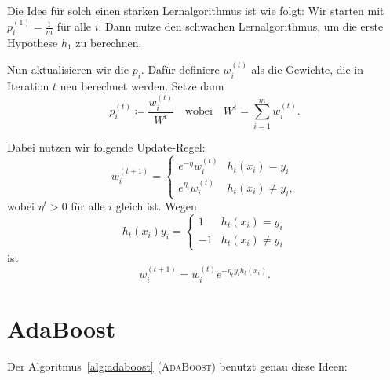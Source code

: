 \documentclass[language=ngerman,algolist,acrolist]{TemplateLecture}
\begin{document}
Die Idee für solch einen starken Lernalgorithmus ist wie folgt: Wir starten mit $p_i^{(1)} = \frac{1}{m}$ für alle $i$. Dann nutze den schwachen Lernalgorithmus, um die erste Hypothese $h_1$ zu berechnen.

Nun aktualisieren wir die $p_i$. Dafür definiere $w_i^{(t)}$ als die Gewichte, die in Iteration $t$ neu berechnet werden. Setze dann 
\begin{equation*}
    p_i^{(t)} \coloneqq \frac{w_i^{(t)}}{W^t} \quad \text{wobei} \quad W^t = \sum_{i = 1}^m w_i^{(t)}.
\end{equation*}

Dabei nutzen wir folgende Update-Regel:
\begin{equation*}
    w_i^{(t+1)} = \begin{cases}
        e^{-\eta} w_i^{(t)} & h_t(x_i) = y_i \\
        e^{\eta_t} w_i^{(t)} & h_t(x_i) \neq y_i,
    \end{cases}
\end{equation*}
wobei $\eta^t > 0$ für alle $i$ gleich ist. Wegen 
\begin{equation*}
    h_t(x_i) y_i = \begin{cases}
        1 & h_t(x_i) = y_i \\
        -1 & h_t(x_i) \neq y_i
    \end{cases}
\end{equation*}
ist 
\begin{equation*}
    w_i^{(t+1)} = w_i^{(t)} e^{-\eta_t y_i h_t(x_i)}.
\end{equation*}

\section{\acs{AdaBoost}}
Der Algoritmus~\ref{alg:adaboost} (\textsc{\acf{AdaBoost}}) benutzt genau diese Ideen:
\begin{algorithm}[h]
    \caption{\textsc{\acs{AdaBoost}}}\label{alg:adaboost}
    \begin{algorithmic}[1]
             
        \EndFor{}
    \end{algorithmic}
\end{algorithm}
\end{document}
